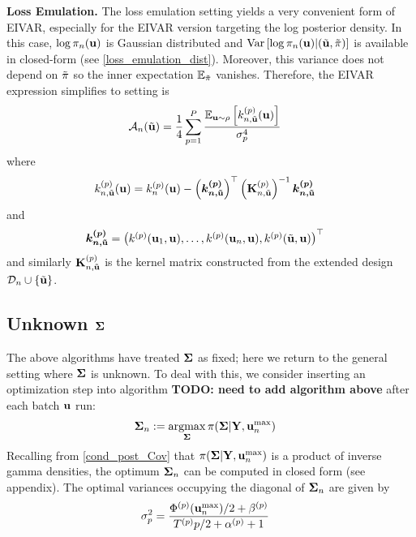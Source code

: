 \documentclass[12pt]{article}
\begin{document}
\bigskip
\noindent
\textbf{Loss Emulation.} The loss emulation setting yields a very convenient form of EIVAR, especially for the EIVAR version targeting the log posterior density. In this case,
$\log \pi_{n}(\mathbf{u})$ is Gaussian distributed and $\mathrm{Var}\left[\log \pi_{n}(\mathbf{u}) | (\tilde{\mathbf{u}}, \tilde{\pi}) \right]$ is 
available in closed-form (see \ref{loss_emulation_dist}). Moreover, this variance does not depend on $\tilde{\pi}$ so the inner expectation $\mathbb{E}_{\tilde{\pi}}$ vanishes. 
Therefore, the EIVAR expression simplifies to  
setting is 
\begin{align}
\mathcal{A}_{n}(\tilde{\mathbf{u}}) &= \frac{1}{4} \sum_{p = 1}^{P} \frac{\mathbb{E}_{\mathbf{u} \sim \rho}\left[k_{n, \tilde{\mathbf{u}}}^{(p)}(\mathbf{u})\right]}{\sigma_{p}^4} \label{EIVAR_llik_loss_emulation}
\end{align}
where 
\begin{align*}
k_{n, \tilde{\mathbf{u}}}^{(p)}(\mathbf{u}) &= k_{n}^{(p)}(\mathbf{u}) - \left(\boldsymbol{k^{(p)}_{n,\tilde{\mathbf{u}}}}\right)^\top \left(\mathbf{K}_{n, \tilde{\mathbf{u}}}^{(p)}\right)^{-1} \boldsymbol{k^{(p)}_{n, \tilde{\mathbf{u}}}}
\end{align*}
and 
\begin{align*}
\boldsymbol{k^{(p)}_{n, \tilde{\mathbf{u}}}} &= \begin{pmatrix} k^{(p)}(\mathbf{u}_1, \mathbf{u}), \dots, 
														       k^{(p)}(\mathbf{u}_{n}, \mathbf{u}), 
														       k^{(p)}(\tilde{\mathbf{u}}, \mathbf{u})  \end{pmatrix}^\top 
\end{align*}
and similarly $\mathbf{K}_{n, \tilde{\mathbf{u}}}^{(p)}$ is the kernel matrix constructed from the extended design $\mathcal{D}_{n} \cup \{\tilde{\mathbf{u}}\}$.

\subsection{Unknown $\boldsymbol{\Sigma}$}
The above algorithms have treated $\boldsymbol{\Sigma}$ as fixed; here we return to the general setting where $\boldsymbol{\Sigma}$ is unknown. To deal with this, we consider inserting an 
optimization step into algorithm \textbf{TODO: need to add algorithm above} after each batch $\mathbf{u}$ run:
\begin{align}
\boldsymbol{\Sigma}_{n} &:= \operatorname*{argmax}_{\boldsymbol{\Sigma}} \pi(\boldsymbol{\Sigma}|\mathbf{Y}, \mathbf{u}_{n}^{\text{max}}) \label{Cov_optimization}
\end{align}
Recalling from \ref{cond_post_Cov} that $\pi(\boldsymbol{\Sigma}|\mathbf{Y}, \mathbf{u}_{n}^{\text{max}})$ is a product of inverse gamma densities, the optimum $\boldsymbol{\Sigma}_{n}$ can 
be computed in closed form (see appendix). The optimal variances occupying the diagonal of $\boldsymbol{\Sigma}_{n}$ are given by 
\begin{align}
\sigma_{p}^2 &= \frac{{\Phi}^{(p)}(\mathbf{u}_{n}^{\text{max}})/2 + {\beta}^{(p)}}{{T}^{(p)}{p}/2 + {\alpha}^{(p)} + 1}
\end{align}
\end{document}
